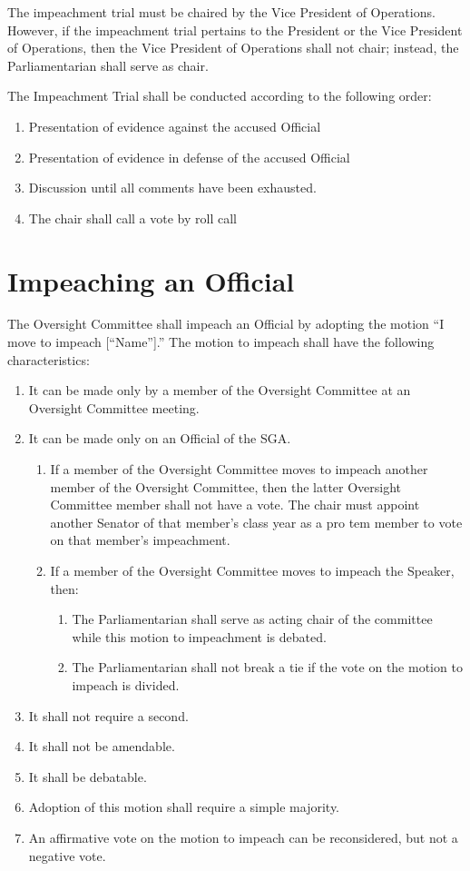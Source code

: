 \documentclass[12pt]{scrreprt}
\begin{document}
The impeachment trial must be chaired by the Vice President of Operations. However, if the impeachment
trial pertains to the President or the Vice President of Operations, then the Vice President of Operations
shall not chair; instead, the Parliamentarian shall serve as chair.

The Impeachment Trial shall be conducted according to the following order:
\begin{enumerate}
    \item Presentation of evidence against the accused Official
    \item Presentation of evidence in defense of the accused Official
    \item Discussion until all comments have been exhausted.
    \item The chair shall call a vote by roll call

\end{enumerate}

\section{Impeaching an Official}

The Oversight Committee shall impeach an Official by adopting the motion “I move to impeach
[“Name”].” The motion to impeach shall have the following characteristics: 
\begin{enumerate}
    \item It can be made only by a member of the Oversight Committee at an Oversight Committee
meeting.
    \item It can be made only on an Official of the SGA.
    \begin{enumerate}
        \item If a member of the Oversight Committee moves to impeach another member of the
Oversight Committee, then the latter Oversight Committee member shall not have a vote.
The chair must appoint another Senator of that member’s class year as a pro tem member
to vote on that member’s impeachment.
        \item If a member of the Oversight Committee moves to impeach the Speaker, then:
        \begin{enumerate}
            \item The Parliamentarian shall serve as acting chair of the committee while this
motion to impeachment is debated.
            \item The Parliamentarian shall not break a tie if the vote on the motion to impeach is divided.
        \end{enumerate}
    \end{enumerate}
    \item It shall not require a second.
    \item It shall not be amendable.
    \item It shall be debatable.
    \item  Adoption of this motion shall require a simple majority.
    \item An affirmative vote on the motion to impeach can be reconsidered, but not a negative vote.
\end{enumerate}
\end{document}
